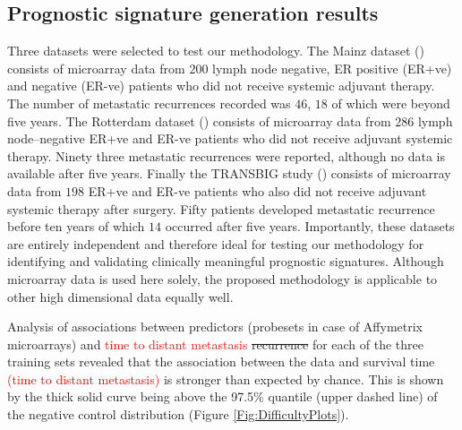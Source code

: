\documentclass[letterpaper,12pt]{article}
\begin{document}
\subsection{Prognostic signature generation results}
Three datasets were selected to test our methodology. The Mainz dataset (\citet{Schmidt:08}) consists of microarray data from $200$ lymph node negative, ER positive (ER+ve) and negative (ER-ve) patients who did not receive systemic adjuvant therapy. The number of metastatic recurrences recorded was $46$, $18$ of which were beyond five years. The Rotterdam dataset (\citet{Wang:05}) consists of microarray data from $286$ lymph node–negative ER+ve and ER-ve patients who did not receive adjuvant systemic therapy. Ninety three metastatic recurrences were reported, although no data is available after five years. Finally the TRANSBIG study (\citet{Desmedt:07}) consists of microarray data from $198$ ER+ve and ER-ve patients who also did not receive adjuvant systemic therapy after surgery. Fifty patients developed metastatic recurrence before ten years of which $14$ occurred after five years. Importantly, these datasets are entirely independent and therefore ideal for testing our methodology for identifying and validating clinically meaningful prognostic signatures. Although microarray data is used here solely, the proposed methodology is applicable to other high dimensional data equally well.

Analysis of associations between predictors (probesets in case of Affymetrix microarrays) and \textcolor{red}{time to distant metastasis }\sout{recurrence} for each of the three training sets revealed that the association between the data and survival time \textcolor{red}{(time to distant metastasis)} is stronger than expected by chance. This is shown by the thick solid curve being above the 97.5\% quantile (upper dashed line) of the negative control distribution (Figure \ref{Fig:DifficultyPlots}).
\end{document}

